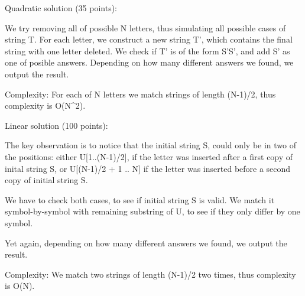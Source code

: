 
Quadratic solution (35 points):

We try removing all of possible N letters, thus simulating all possible cases of string T. 
For each letter, we construct a new string T', which contains the final string with one letter deleted. 
We check if T' is of the form S'S', and add S' as one of posible answers.
Depending on how many different answers we found, we output the result. 

Complexity: For each of N letters we match strings of length (N-1)/2, thus complexity
is O(N^2).

Linear solution (100 points):

The key observation is to notice that the initial string S, could only be in two of the positions:
either U[1..(N-1)/2], if the letter was inserted after a first copy of inital string S,
or U[(N-1)/2 + 1 .. N] if the letter was inserted before a second copy of initial string S. 

We have to check both cases, to see if initial string S is valid. We match it symbol-by-symbol with
remaining substring of U, to see if they only differ by one symbol. 

Yet again, depending on how many different answers we found, we output the result.

Complexity: We match two strings of length (N-1)/2 two times, thus complexity is O(N).


